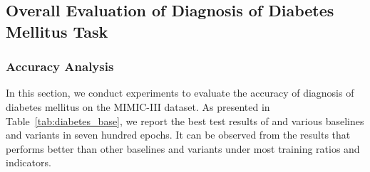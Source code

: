 \subsection{Overall Evaluation of Diagnosis of Diabetes Mellitus Task}\label{sec:diabetes-overall}

\subsubsection{Accuracy Analysis}\label{sec:diabetes-accuracy}
In this section, we conduct experiments to evaluate the accuracy of diagnosis of diabetes mellitus on the MIMIC-III dataset.
As presented in Table~\ref{tab:diabetes_base}, we report the best test results of \RioGNN and various baselines and variants in seven hundred epochs.
It can be observed from the results that \RioGNN performs better than other baselines and variants under most training ratios and indicators.



